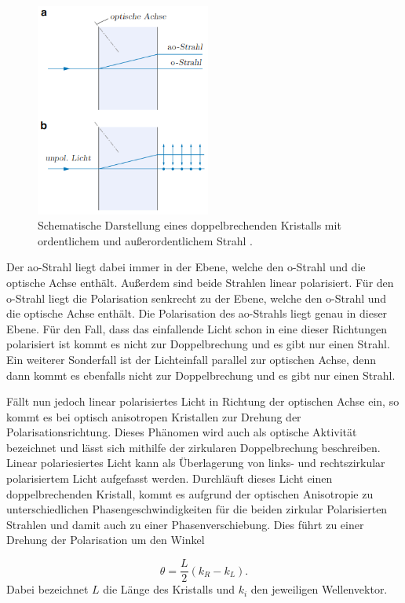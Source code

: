 \begin{figure}[H]
  \centering
  \includegraphics[height=7cm]{Doppelbrechend.png}
  \caption{Schematische Darstellung eines doppelbrechenden Kristalls mit ordentlichem und außerordentlichem Strahl \cite{Heintze}.}
  \label{fig:Doppelbrechend}
\end{figure}

Der ao-Strahl liegt dabei immer in der Ebene, welche den o-Strahl und die
optische Achse enthält. Außerdem sind beide Strahlen linear polarisiert.
Für den o-Strahl liegt die Polarisation senkrecht zu der Ebene, welche den o-Strahl und die
optische Achse enthält. Die Polarisation des ao-Strahls liegt genau in dieser Ebene.
Für den Fall, dass das einfallende Licht schon in eine dieser Richtungen polarisiert ist
kommt es nicht zur Doppelbrechung und es gibt nur einen Strahl.
Ein weiterer Sonderfall ist der Lichteinfall parallel zur optischen Achse, denn dann
kommt es ebenfalls nicht zur Doppelbrechung und es gibt nur einen Strahl.


Fällt nun jedoch linear polarisiertes Licht in Richtung der optischen Achse ein, so kommt es
bei optisch anisotropen Kristallen zur Drehung der Polarisationsrichtung. Dieses Phänomen wird
auch als optische Aktivität bezeichnet und lässt sich mithilfe der zirkularen Doppelbrechung
beschreiben.
Linear polariesiertes Licht kann als Überlagerung von links- und rechtszirkular
polarisiertem Licht aufgefasst werden. Durchläuft dieses Licht einen doppelbrechenden Kristall, kommt
es aufgrund der optischen Anisotropie zu unterschiedlichen Phasengeschwindigkeiten für die beiden zirkular
Polarisierten Strahlen und damit auch zu einer Phasenverschiebung. Dies führt
zu einer Drehung der Polarisation um den Winkel

\begin{equation}
  \theta=\frac{L}{2}(k_R -k_L).
\end{equation}
Dabei bezeichnet $L$ die Länge des Kristalls und $k_i$ den jeweiligen Wellenvektor.



